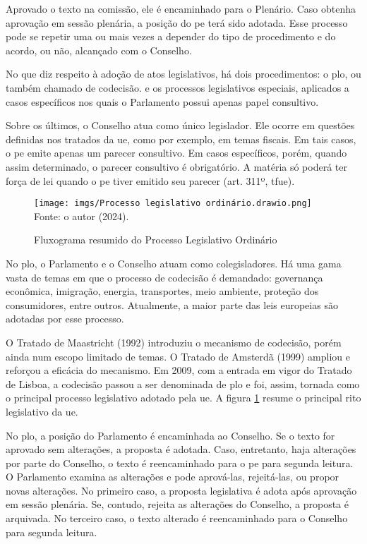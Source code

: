 Aprovado o texto na comissão, ele é encaminhado para o Plenário. Caso obtenha aprovação em sessão plenária, a posição do \acrshort{pe} terá sido adotada. Esse processo pode se repetir uma ou mais vezes a depender do tipo de procedimento e do acordo, ou não, alcançado com o Conselho.

No que diz respeito à adoção de atos legislativos, há dois procedimentos: o \acrfull{plo}, ou também chamado de codecisão. e os processos legislativos especiais, aplicados a casos específicos nos quais o Parlamento possui apenas papel consultivo.

Sobre os últimos, o Conselho atua como único legislador. Ele ocorre em questões definidas nos tratados da \acrshort{ue}, como por exemplo, em temas fiscais. Em tais casos, o \acrshort{pe} emite apenas um parecer consultivo. Em casos específicos, porém, quando assim determinado, o parecer consultivo é obrigatório. A matéria só poderá ter força de lei quando o \acrshort{pe} tiver emitido seu parecer (art. 311º, \acrshort{tfue}).

\begin{figure}
    \caption{Fluxograma resumido do Processo Legislativo Ordinário}
    \texttt{[image: imgs/Processo legislativo ordinário.drawio.png]}
    \label{fig:plo}
    \centering
    Fonte: o autor (2024).
\end{figure}


No \acrshort{plo}, o Parlamento e o Conselho atuam como colegisladores. Há uma gama vasta de temas em que o processo de codecisão é demandado: governança econômica, imigração, energia, transportes, meio ambiente, proteção dos consumidores, entre outros. Atualmente, a maior parte das leis europeias são adotadas por esse processo. 

O Tratado de Maastricht (1992) introduziu o mecanismo de codecisão, porém ainda num escopo limitado de temas. O Tratado de Amsterdã (1999) ampliou e reforçou a eficácia do mecanismo. Em 2009, com a entrada em vigor do Tratado de Lisboa, a codecisão passou a ser denominada de \acrshort{plo} e foi, assim, tornada como o principal processo legislativo adotado pela \acrshort{ue}. A figura \ref{fig:plo} resume o principal rito legislativo da \acrshort{ue}.

No \acrshort{plo}, a posição do Parlamento é encaminhada ao Conselho. Se o texto for aprovado sem alterações, a proposta é adotada. Caso, entretanto, haja alterações por parte do Conselho, o texto é reencaminhado para o \acrshort{pe} para segunda leitura. O Parlamento examina as alterações e pode aprová-las, rejeitá-las, ou propor novas alterações. No primeiro caso, a proposta legislativa é adota após aprovação em sessão plenária. Se, contudo, rejeita as alterações do Conselho, a proposta é arquivada. No terceiro caso, o texto alterado é reencaminhado para o Conselho para segunda leitura.

